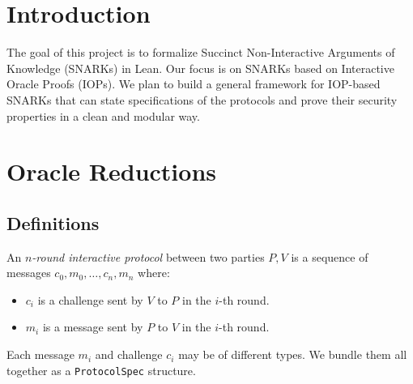 %

\chapter{Introduction}

The goal of this project is to formalize Succinct Non-Interactive Arguments of Knowledge (SNARKs) in Lean. Our focus is on SNARKs based on Interactive Oracle Proofs (IOPs). We plan to build a general framework for IOP-based SNARKs that can state specifications of the protocols and prove their security properties in a clean and modular way.

\chapter{Oracle Reductions}

\section{Definitions}

\begin{definition}
    \label{def:interactive_protocol}
    An \emph{$n$-round interactive protocol} between two parties $P, V$ is a sequence of messages $c_0, m_0, \dots, c_n, m_n$ where:
    \begin{itemize}
        \item $c_i$ is a challenge sent by $V$ to $P$ in the $i$-th round.
        \item $m_i$ is a message sent by $P$ to $V$ in the $i$-th round.
    \end{itemize}
    Each message $m_i$ and challenge $c_i$ may be of different types. We bundle them all together as a \verb|ProtocolSpec| structure.
\end{definition}

